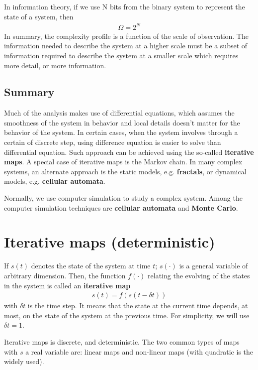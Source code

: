 In information theory, if we use N bits from the binary system to
represent the state of a system, then
\begin{eqnarray*}
  \Omega = 2^N
\end{eqnarray*}
In summary, the complexity profile is a function of the scale of
observation.  The information needed to describe the system at a
higher scale must be a subset of information required to describe the
system at a smaller scale which requires more detail, or more
information.


\subsection{Summary}
\label{sec:summary}

Much of the analysis makes use of differential equations, which
assumes the smoothness of the system in behavior and local details
doesn't matter for the behavior of the system. In certain cases, when
the system involves through a certain of discrete step, using
difference equation is easier to solve than differential
equation. Such approach can be achieved using the so-called
{\bf iterative maps}.  A special case of iterative maps is the Markov
chain. In many complex systems, an alternate approach is the static
models, e.g. {\bf fractals}, or dynamical models, e.g.
{\bf cellular automata}.

Normally, we use computer simulation to study a complex system. Among
the computer simulation techniques are {\bf cellular automata} and
{\bf Monte Carlo}.

\section{Iterative maps (deterministic)}
\label{sec:iterative-maps}

If $s(t)$ denotes the state of the system at time $t$; $s(\cdot)$ is a
general variable of arbitrary dimension. Then, the function $f(\cdot)$
relating the evolving of the states in the system is called an {\bf
  iterative map}
\begin{eqnarray}
  \label{eq:253}
  s(t) = f(s(t-\delta t))
\end{eqnarray}
with $\delta t$ is the time step. It means that the state at the
current time depends, at most, on the state of the system at the
previous time. For simplicity, we will use $\delta t = 1$.

Iterative maps is discrete, and deterministic. The two common types of
maps with $s$ a real variable are: linear maps and non-linear maps
(with quadratic is the widely used). 


